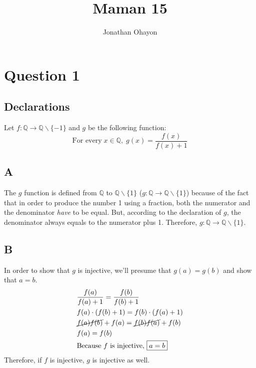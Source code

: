 \documentclass[12pt, oneside]{article}
\title{Maman 15}
\author{Jonathan Ohayon}
\begin{document}
\maketitle

\begin{center}
\end{center}

\section{Question 1}

\setcounter{subsection}{-1}
\subsection{Declarations}
Let $f:\mathbb{Q} \rightarrow \mathbb{Q}\backslash\{-1\}$ and $g$ be the following function:
\begin{equation*}
\text{For every}\;x \in \mathbb{Q},\;g(x) = \dfrac{f(x)}{f(x) + 1}
\end{equation*}

\subsection{A}
The $g$ function is defined from $\mathbb{Q}$ to $\mathbb{Q}\backslash\{1\}$ ($g: \mathbb{Q} \rightarrow \mathbb{Q}\backslash\{1\}$) because of the fact that in order to produce the number 1 using a fraction, both the numerator and the denominator \emph{have} to be equal. But, according to the declaration of $g$, the denominator always equals to the numerator plus 1. Therefore, $g: \mathbb{Q} \rightarrow \mathbb{Q}\backslash\{1\}$.

\subsection{B}
In order to show that $g$ is injective, we'll presume that $g(a) = g(b)$ and show that $a = b$.
\begin{eqnarray*}
& \frac{f(a)}{f(a) + 1} = \frac{f(b)}{f(b) + 1}\\
& f(a) \cdot (f(b) + 1) = f(b) \cdot (f(a) + 1)\\
& \cancel{f(a)f(b)} + f(a) = \cancel{f(b)f(a)} + f(b)\\
& f(a) = f(b)\\
& \text{Because $f$ is injective, }\framebox{$a = b$}
\end{eqnarray*}
Therefore, if $f$ is injective, $g$ is injective as well.
\clearpage
\end{document}
